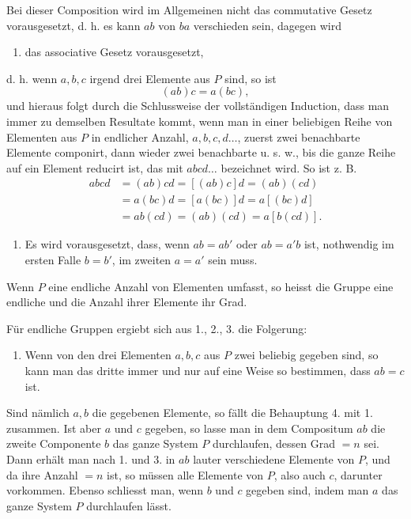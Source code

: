 \documentclass[11pt]{article}
\begin{document}
Bei dieser Composition wird im Allgemeinen nicht das commutative Gesetz vorausgesetzt, d. h. es kann $ab$ von $ba$ verschieden sein, dagegen wird
\begin{enumerate}[resume,label=\arabic*.]
\item das associative Gesetz vorausgesetzt,
\end{enumerate}
d. h. wenn $a,b,c$ irgend drei Elemente aus $P$ sind, so ist
\[
(ab)c=a(bc),
\]
und hieraus folgt durch die Schlussweise der vollständigen Induction, dass man immer zu demselben Resultate kommt, wenn man in einer beliebigen Reihe von Elementen aus $P$ in endlicher Anzahl, $a,b,c,d\ldots$, zuerst zwei benachbarte Elemente componirt, dann wieder zwei benachbarte u. s. w., bis die ganze Reihe auf ein Element reducirt ist, das mit $abcd\ldots$ bezeichnet wird. So ist z. B.
\[
\begin{aligned}
abcd&=(ab)cd=[(ab)c]d=(ab)(cd)\\
&=a(bc)d=[a(bc)]d=a[(bc)d]\\
&=ab(cd)=(ab)(cd)=a[b(cd)].
\end{aligned}
\]
\begin{enumerate}[resume,label=\arabic*.]
\item Es wird vorausgesetzt, dass, wenn $ab=ab'$ oder $ab=a'b$ ist, nothwendig im ersten Falle $b=b'$, im zweiten $a=a'$ sein muss.
\end{enumerate}

Wenn $P$ eine endliche Anzahl von Elementen umfasst, so heisst die Gruppe eine endliche und die Anzahl ihrer Elemente ihr Grad.

Für endliche Gruppen ergiebt sich aus 1., 2., 3. die Folgerung:
\begin{enumerate}[resume,label=\arabic*.]
\item Wenn von den drei Elementen $a,b,c$ aus $P$ zwei beliebig gegeben sind, so kann man das dritte immer und nur auf eine Weise so bestimmen, dass $ab=c$ ist.
\end{enumerate}
Sind nämlich $a,b$ die gegebenen Elemente, so fällt die Behauptung 4. mit 1. zusammen. Ist aber $a$ und $c$ gegeben, so lasse man in dem Compositum $ab$ die zweite Componente $b$ das ganze System $P$ durchlaufen, dessen Grad $=n$ sei. Dann erhält man nach 1. und 3. in $ab$ lauter verschiedene Elemente von $P$, und da ihre Anzahl $=n$ ist, so müssen alle Elemente von $P$, also auch $c$, darunter vorkommen. Ebenso schliesst man, wenn $b$ und $c$ gegeben sind, indem man $a$ das ganze System $P$ durchlaufen lässt.
\end{document}
